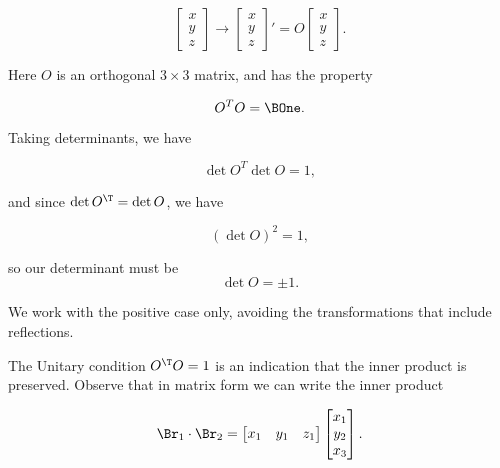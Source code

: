 \begin{equation}\label{eqn:relativisticElectrodynamicsL6:10}
\begin{bmatrix}
x \\
y \\
z
\end{bmatrix} 
\rightarrow 
\begin{bmatrix}
x \\
y \\
z
\end{bmatrix}' = O 
\begin{bmatrix}
x \\
y \\
z
\end{bmatrix}.
\end{equation}

Here $O$ is an orthogonal $3 \times 3$ matrix, and has the property

\begin{equation}\label{eqn:relativisticElectrodynamicsL6:11}
O^T O = \BOne.
\end{equation}

Taking determinants, we have

\begin{equation}\label{eqn:relativisticElectrodynamicsL6:12}
\det{ O^T } \det{ O} = 1,
\end{equation}

and since $\det{O^\T} = \det{ O }$, we have

\begin{equation}\label{eqn:relativisticElectrodynamicsL6:13}
(\det{O})^2 = 1,
\end{equation}

so our determinant must be 
\begin{equation}\label{eqn:relativisticElectrodynamicsL6:14}
\det O = \pm 1.
\end{equation}

We work with the positive case only, avoiding the transformations that include reflections.

The Unitary condition $O^\T O = 1$ is an indication that the inner product is preserved.  Observe that in matrix form we can write the inner product

\begin{equation}\label{eqn:relativisticElectrodynamicsL6:15}
\Br_1 \cdot \Br_2 = 
\begin{bmatrix}
x_1 & y_1 & z_1
\end{bmatrix}
\begin{bmatrix}
x_1 \\
y_2 \\
x_3 \\
\end{bmatrix}.
\end{equation}

